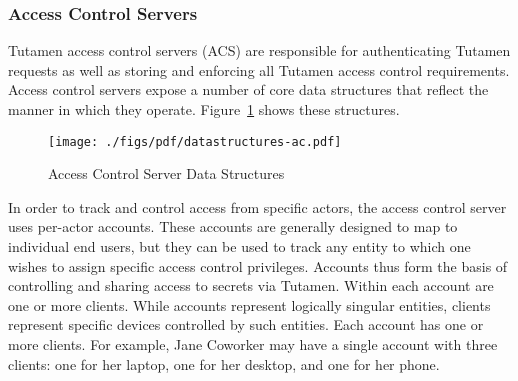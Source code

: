 \subsubsection{Access Control Servers}
\label{sec:tutamen:arch:acs}

Tutamen access control servers (ACS) are responsible for
authenticating Tutamen requests as well as storing and enforcing all
Tutamen access control requirements. Access control servers expose a
number of core data structures that reflect the manner in which they
operate. Figure~\ref{fig:tutamen:acstructs} shows these structures.

\begin{figure}[th]
  \centering
  \texttt{[image: ./figs/pdf/datastructures-ac.pdf]}
  \caption{Access Control Server Data Structures}
  \label{fig:tutamen:acstructs}
\end{figure}

In order to track and control access from specific actors, the access
control server uses per-actor accounts. These accounts are generally
designed to map to individual end users, but they can be used to track
any entity to which one wishes to assign specific access control
privileges. Accounts thus form the basis of controlling and sharing
access to secrets via Tutamen. Within each account are one or more
clients. While accounts represent logically singular entities, clients
represent specific devices controlled by such entities. Each account
has one or more clients. For example, Jane Coworker may have a single
account with three clients: one for her laptop, one for her desktop,
and one for her phone.

